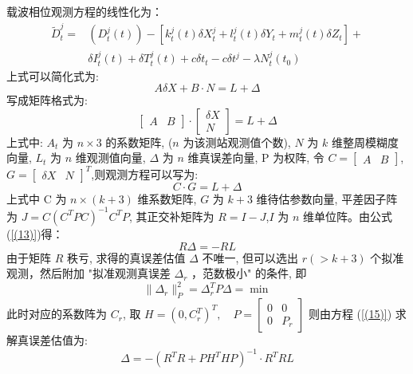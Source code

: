 \documentclass[12pt,hyperref,a4paper,UTF8]{ctexart}
\begin{document}
载波相位观测方程的线性化为：
\begin{equation}
    \begin{aligned}
        \widetilde{D}_t^j= & \left(D_t^j(t)\right)-\left[k_t^j(t) \delta X_t^j+l_t^j(t) \delta Y_t+m_t^j(t) \delta Z_t\right]+ \\
        & \delta I_t^j(t)+\delta T_t^j(t)+c \delta t_t-c \delta t^j-\lambda N_t^j\left(t_0\right)
    \end{aligned}
\end{equation}
上式可以简化式为:
\begin{equation}
    A \delta X+B \cdot N=L+\Delta 
\end{equation}
写成矩阵格式为:
\begin{equation}
\left[\begin{array}{ll}
A & B
\end{array}\right] \cdot\left[\begin{array}{c}
\delta X \\
N
\end{array}\right]=L+\Delta
\label{(13)}
\end{equation}
上式中: $A_t$ 为 $n \times 3$ 的系数矩阵, ($n$ 为该测站观测值个数), $N$ 为 $k$ 维整周模糊度向量, $L_t$ 为 $n$ 维观测值向量, $\Delta$ 为 $n$ 维真误差向量, P 为权阵, 令 $C=\left[\begin{array}{ll}A & B\end{array}\right]$, $G=\left[\begin{array}{ll}\delta X & N\end{array}\right]^T$,则观测方程可以写为:
\begin{equation}
    C \cdot G=L+\Delta
\end{equation}
上式中 C 为 $n \times(k+3)$ 维系数矩阵, $G$ 为 $k+3$ 维待估参数向量, 平差因子阵为 $J=C\left(C^T P C\right)^{-1} C^T P$, 其正交补矩阵为 $R=I-J $,$I$ 为 $n$ 维单位阵。由公式(\ref{(13)})得：
\begin{equation}
    R \Delta=-R L
    \label{(15)}
\end{equation}
由于矩阵 $R$ 秩亏, 求得的真误差估值 $\Delta$ 不唯一, 但可以选出 $r(>k+3)$ 个拟准观测，然后附加 "拟准观测真误差 $\Delta_r$ ，范数极小" 的条件, 即
\begin{equation}
    \|\Delta_r\|^2_P=\Delta_r^T P \Delta=\min
\end{equation}
此时对应的系数阵为 $C_r$, 取
$
H=\left(0, C_r^T\right)^T, \quad P=\left[\begin{array}{ll}
0 & 0 \\
0 & P_r
\end{array}\right]
$
则由方程 (\ref{(15)}) 求解真误差估值为:
\begin{equation}
    \Delta=-\left(R^T R+P H^T H P\right)^{-1} \cdot R^T R L
\end{equation}
\end{document}

